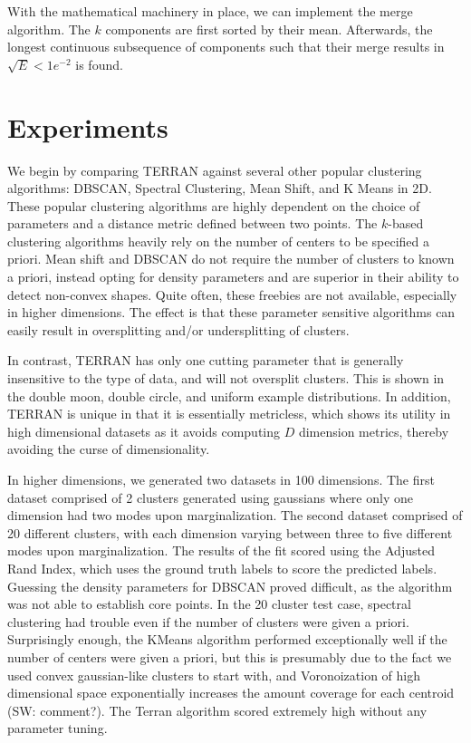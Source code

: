 \documentclass{acm_proc_article-sp}
\begin{document}
With the mathematical machinery in place, we can implement the merge algorithm. The $k$ components are first sorted by their mean. Afterwards, the longest continuous subsequence of components such that their merge results in $\sqrt{E} < 1e^{-2}$ is found.
\section{Experiments}

We begin by comparing TERRAN against several other popular clustering algorithms: DBSCAN, Spectral Clustering, Mean Shift, and K Means in 2D. These popular clustering algorithms are highly dependent on the choice of parameters and a distance metric defined between two points. The $k$-based clustering algorithms heavily rely on the number of centers to be specified a priori. Mean shift and DBSCAN do not require the number of clusters to known a priori, instead opting for density parameters and are superior in their ability to detect non-convex shapes. Quite often, these freebies are not available, especially in higher dimensions. The effect is that these parameter sensitive algorithms can easily result in oversplitting and/or undersplitting of clusters. 

In contrast, TERRAN has only one cutting parameter that is generally insensitive to the type of data, and will not oversplit clusters. This is shown in the double moon, double circle, and uniform example distributions. In addition, TERRAN is unique in that it is essentially metricless, which shows its utility in high dimensional datasets as it avoids computing $D$ dimension metrics, thereby avoiding the curse of dimensionality.

In higher dimensions, we generated two datasets in 100 dimensions. The first dataset comprised of 2 clusters generated using gaussians where only one dimension had two modes upon marginalization. The second dataset comprised of 20 different clusters, with each dimension varying between three to five different modes upon marginalization. The results of the fit scored using the Adjusted Rand Index, which uses the ground truth labels to score the predicted labels. Guessing the density parameters for DBSCAN proved difficult, as the algorithm was not able to establish core points. In the 20 cluster test case, spectral clustering had trouble even if the number of clusters were given a priori. Surprisingly enough, the KMeans algorithm performed exceptionally well if the number of centers were given a priori, but this is presumably due to the fact we used convex gaussian-like clusters to start with, and Voronoization of high dimensional space exponentially increases the amount coverage for each centroid (SW: comment?). The Terran algorithm scored extremely high without any parameter tuning. 
\end{document}
